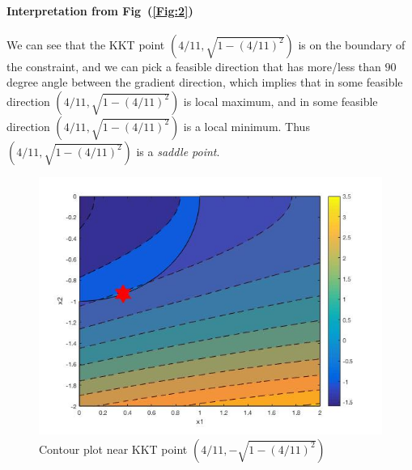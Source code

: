 \begin{enumerate}
\begin{enumerate}
\paragraph{Interpretation from Fig~(\ref{Fig:2})}We can see that the KKT point $(4/11,\sqrt{1-(4/11)^2})$ is on the boundary of the constraint, and we can pick a feasible direction that has more/less than $90$ degree angle between the gradient direction, which implies that in some feasible direction $(4/11,\sqrt{1-(4/11)^2})$ is local maximum, and in some feasible direction $(4/11,\sqrt{1-(4/11)^2})$ is a local minimum. Thus $(4/11,\sqrt{1-(4/11)^2})$ is a \emph{saddle point}.
\begin{figure}[H]
\includegraphics[width=1\textwidth]{A_7_3}
\centering
\caption{Contour plot near KKT point $(4/11,-\sqrt{1-(4/11)^2})$}
\label{Fig:3}
\end{figure}

\end{enumerate}
\end{enumerate}
